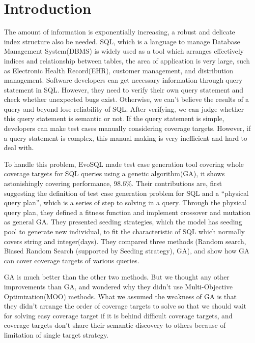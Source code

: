 \chapter{Introduction}

The amount of information is exponentially increasing, a robust and delicate index structure also be needed. SQL, which is a language to manage Database Management System(DBMS) is widely used as a tool which arranges effectively indices and relationship between tables, the area of application is very large, such as Electronic Health Record(EHR), customer management, and distribution management. Software developers can get necessary information through query statement in SQL. However, they need to verify their own query statement and check whether unexpected bugs exist. Otherwise, we can't believe the results of a query and beyond lose reliability of SQL. After verifying, we can judge whether this query statement is semantic or not. If the query statement is simple, developers can make test cases manually considering coverage targets. However, if a query statement is complex, this manual making is very inefficient and hard to deal with.

To handle this problem, EvoSQL\cite{castelein2018search} made test case generation tool covering whole coverage targets for SQL queries using a genetic algorithm(GA), it shows astonishingly covering performance, 98.6\%. Their contributions are, first suggesting the definition of test case generation problem for SQL and a ``physical query plan'', which is a series of step to solving in a query. Through the physical query plan, they defined a fitness function and implement crossover and mutation as general GA. They presented seeding strategies, which the model has seeding pool to generate new individual, to fit the characteristic of SQL which normally covers string and integer(days). They compared three methods (Random search, Biased Random Search (supported by Seeding strategy), GA), and show how GA can cover coverage targets of various queries.
 

GA is much better than the other two methods. But we thought any other improvements than GA, and wondered why they didn't use Multi-Objective Optimization(MOO)\cite{panichella2015reformulating} methods. What we assumed the weakness of GA is that they didn't arrange the order of coverage targets to solve so that we should wait for solving easy coverage target if it is behind difficult coverage targets, and coverage targets don't share their semantic discovery to others because of limitation of single target strategy.
 

